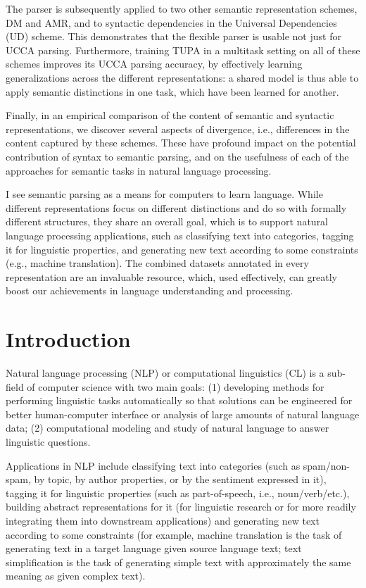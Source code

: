 \documentclass[12pt,a4paper]{report}
\begin{document}
The parser is subsequently applied to two other semantic representation schemes,
DM and AMR, and to syntactic dependencies in the Universal Dependencies (UD)
scheme. This demonstrates that the flexible parser is usable not just for UCCA
parsing.
Furthermore, training TUPA in a multitask setting on all of these schemes
improves its UCCA parsing accuracy, by effectively learning generalizations
across the different representations:
a shared model is thus able to apply semantic distinctions in one task,
which have been learned for another.

Finally, in an empirical comparison of
the content of semantic and syntactic representations, we discover several
aspects of divergence, i.e., differences in the content captured by these schemes.
These have profound impact on the potential
contribution of syntax to semantic parsing, and on the usefulness of each of
the approaches for semantic tasks in natural language processing.

I see semantic parsing as a means for computers to learn language.
While different representations focus on different distinctions and do so
with formally different structures, they share an overall goal,
which is to support natural language processing applications,
such as classifying text into categories,
tagging it for linguistic properties,
and generating new text according to some constraints
(e.g., machine translation).
The combined datasets annotated in every representation are an invaluable
resource, which, used effectively, can greatly boost our achievements in
language understanding and processing.

\pagebreak

\tableofcontents

\chapter{Introduction}

Natural language processing (NLP) or computational linguistics (CL)
is a sub-field of computer science with two main goals:
(1) developing methods for performing linguistic tasks automatically
so that solutions can be engineered for better human-computer interface
or analysis of large amounts of natural language data;
(2) computational modeling and study of natural language to answer linguistic questions.

Applications in NLP include classifying text into categories
(such as spam/non-spam, by topic, by author properties, or by
the sentiment expressed in it),
tagging it for linguistic properties (such as part-of-speech, i.e., noun/verb/etc.),
building abstract representations for it (for linguistic research or for
more readily integrating them into downstream applications)
and generating new text according to some constraints (for example,
machine translation is the task of generating
text in a target language given source language text;
text simplification is the task of generating simple text with approximately the same
meaning as given complex text).
\end{document}
